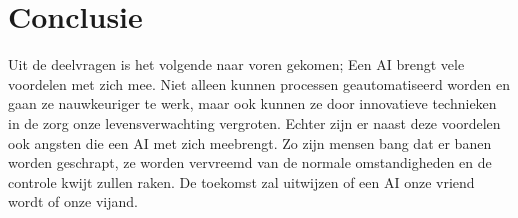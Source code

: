 \documentclass{article}
\begin{document}
\section{Conclusie}
Uit de deelvragen is het volgende naar voren gekomen; Een AI brengt vele voordelen met zich mee. Niet alleen kunnen processen geautomatiseerd worden en gaan ze nauwkeuriger te werk, maar ook kunnen ze door innovatieve technieken in de zorg onze levensverwachting vergroten. Echter zijn er naast deze voordelen ook angsten die een AI met zich meebrengt. Zo zijn mensen bang dat er banen worden geschrapt, ze worden vervreemd van de normale omstandigheden en de controle kwijt zullen raken. De toekomst zal uitwijzen of een AI onze vriend wordt of onze vijand.

\newpage
\nocite{robotsamenleving,vriendofvijand,arbeidsmarkt,breinoverbodig,stephenhawking,killemachine,uitgeroeid,autonomous,benificialai,pastandfuture,computerziekenhuis}


% 
% 
\end{document}
